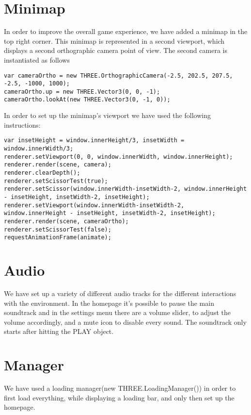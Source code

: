 \documentclass[a4paper,oneside]{report}
\begin{document}
\section{Minimap}
In order to improve the overall game experience, we have added a minimap in the top right corner. This minimap is represented in a second viewport, which displays a second orthographic camera point of view. The second camera is instantiated as follows
\begin{lstlisting}
var cameraOrtho = new THREE.OrthographicCamera(-2.5, 202.5, 207.5, -2.5, -1000, 1000);
cameraOrtho.up = new THREE.Vector3(0, 0, -1);
cameraOrtho.lookAt(new THREE.Vector3(0, -1, 0));
\end{lstlisting}
In order to set up the minimap's viewport we have used the following instructions:
\begin{lstlisting}
var insetHeight = window.innerHeight/3, insetWidth = window.innerWidth/3;
renderer.setViewport(0, 0, window.innerWidth, window.innerHeight);
renderer.render(scene, camera);
renderer.clearDepth();
renderer.setScissorTest(true);
renderer.setScissor(window.innerWidth-insetWidth-2, window.innerHeight - insetHeight, insetWidth-2, insetHeight);
renderer.setViewport(window.innerWidth-insetWidth-2, window.innerHeight - insetHeight, insetWidth-2, insetHeight);
renderer.render(scene, cameraOrtho);
renderer.setScissorTest(false);
requestAnimationFrame(animate);
\end{lstlisting}

\section{Audio}
We have set up a variety of different audio tracks for the different interactions with the environment.
In the homepage it's possible to pause the main soundtrack and in the settings menu there are a volume slider, to adjust the volume accordingly, and a mute icon to disable every sound. The soundtrack only starts after hitting the PLAY object.

\section{Manager}
We have used a loading manager(new THREE.LoadingManager()) in order to first load everything, while displaying a loading bar, and only then set up the homepage.
\end{document}
